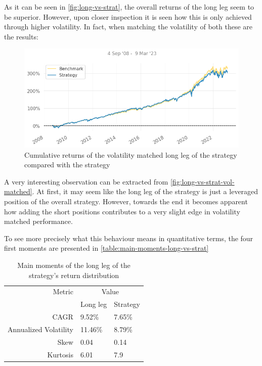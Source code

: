 As it can be seen in \autoref{fig:long-vs-strat}, the overall returns of the long leg seem to be superior. However, upon closer inspection it is seen how this is only achieved through higher volatility. In fact, when matching the volatility of both these are the results:
\begin{figure}[ht]
    \captionsetup{justification=centering}
    \includegraphics[width=\linewidth]{assets/long-vs-strat-vol-matched.png}
    \caption{Cumulative returns of the volatility matched long leg of the strategy compared with the strategy}
    \label{fig:long-vs-strat-vol-matched}
\end{figure}

A very interesting observation can be extracted from \autoref{fig:long-vs-strat-vol-matched}. At first, it may seem like the long leg of the strategy is just a leveraged position of the overall strategy. However, towards the end it becomes apparent how adding the short positions contributes to a very slight edge in volatility matched performance.

To see more precisely what this behaviour means in quantitative terms, the four first moments are presented in \autoref{table:main-moments-long-vs-strat}

\begin{table}[ht]
    \centering
    \begin{tabular}{rll}
        \toprule
        Metric & \multicolumn{2}{c}{Value} \\ 
        \cmidrule(lr){2-3}
            & Long leg & Strategy \\
        \midrule
        CAGR & 9.52\% & 7.65\% \\
        Annualized Volatility & 11.46\% & 8.79\% \\
        Skew & 0.04 & 0.14 \\
        Kurtosis & 6.01 & 7.9 \\
        \bottomrule
    \end{tabular}
    \caption{Main moments of the long leg of the strategy's return distribution}
    \label{table:main-moments-long-vs-strat}
\end{table}


